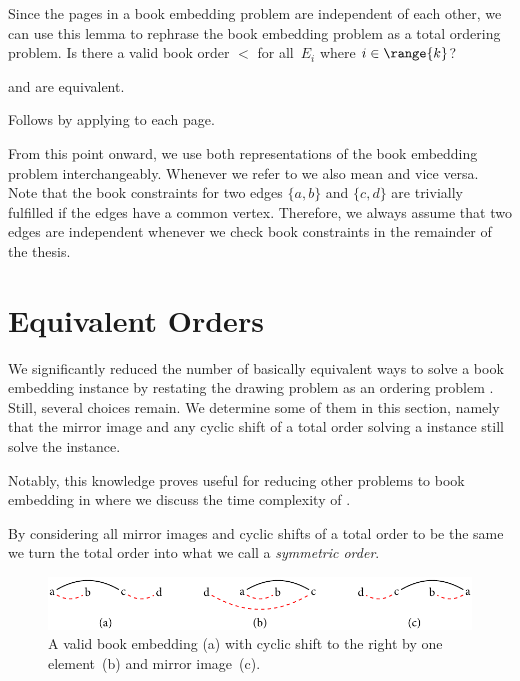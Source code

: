 \noindent Since the pages in a book embedding problem are independent of each
other, we can use this lemma to rephrase the book embedding problem
as a total ordering problem.
{Is there a valid book order $<$ for all~$E_i$ where $i \in \range{k}$?}
\begin{theorem}
\label{lemma:all-book-constraints}
\probBook and \probBookOrder are equivalent.
\end{theorem}
\begin{myproof}
Follows by applying  to each page.\qedhere
\end{myproof}

From this point onward, we use both representations of the book embedding problem
interchangeably. Whenever we refer to \probBook we also mean \probBookOrder and vice versa.
Note that the book constraints for two edges $\{a, b\}$ and $\{c, d\}$ are trivially fulfilled if
the edges have a common vertex. Therefore, we always assume that two edges are independent whenever
we check book constraints in the remainder of the thesis.

\section{Equivalent Orders}\label{section:symmetry}

We significantly reduced the number of basically equivalent ways to solve a book
embedding instance by restating the drawing problem \probBook as an ordering problem \probBookOrder. Still, several choices remain.
We determine some of them in this section, namely that the mirror image and any cyclic shift of a total order solving a \probBook instance still solve the instance. 

Notably, this knowledge proves useful for reducing other problems to book embedding in 
 where we discuss the time complexity of \probBook.

By considering all mirror images and cyclic shifts of a total order to be the same
we turn the total order into what we call a \emph{symmetric order}.

\begin{figure}[\placement]\centering
    \includegraphics[width=\textwidth]{figures/t_symmetry}
    \caption[Equivalent orders]{A valid book embedding (a) with cyclic shift to the right by one element~(b)
and mirror image~(c).}
    \label{figure:symmetry}
\end{figure}

